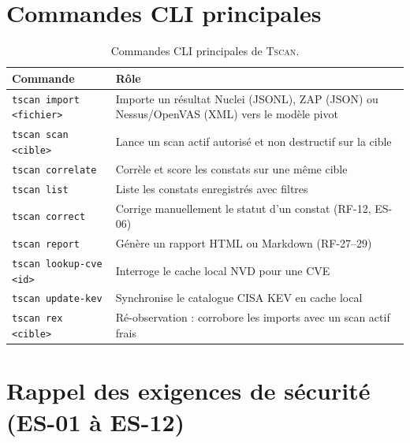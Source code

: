 \documentclass[11pt,a4paper]{report}
\newcommand{\tscan}{\textsc{Tscan}}
\newcommand{\code}[1]{\texttt{#1}}
\begin{document}
\chapter{Commandes CLI principales}

\begin{table}[h!]
\centering
\small
\begin{tabular}{@{}lp{9.5cm}@{}}
\toprule
\textbf{Commande} & \textbf{Rôle} \\
\midrule
\code{tscan import <fichier>} & Importe un résultat Nuclei (JSONL), ZAP (JSON) ou Nessus/OpenVAS (XML) vers le modèle pivot \\
\code{tscan scan <cible>} & Lance un scan actif autorisé et non destructif sur la cible \\
\code{tscan correlate} & Corrèle et score les constats sur une même cible \\
\code{tscan list} & Liste les constats enregistrés avec filtres \\
\code{tscan correct} & Corrige manuellement le statut d'un constat (RF-12, ES-06) \\
\code{tscan report} & Génère un rapport HTML ou Markdown (RF-27--29) \\
\code{tscan lookup-cve <id>} & Interroge le cache local NVD pour une CVE \\
\code{tscan update-kev} & Synchronise le catalogue CISA KEV en cache local \\
\code{tscan rex <cible>} & Ré-observation : corrobore les imports avec un scan actif frais \\
\bottomrule
\end{tabular}
\caption{Commandes CLI principales de \tscan{}.}
\end{table}

\chapter{Rappel des exigences de sécurité (ES-01 à ES-12)}
\end{document}
